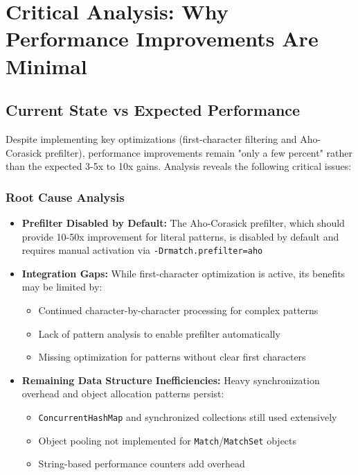 \documentclass[11pt,a4paper]{article}
\begin{document}
\section{Critical Analysis: Why Performance Improvements Are Minimal}

\subsection{Current State vs Expected Performance}

Despite implementing key optimizations (first-character filtering and Aho-Corasick prefilter), performance improvements remain "only a few percent" rather than the expected 3-5x to 10x gains. Analysis reveals the following critical issues:

\subsubsection{Root Cause Analysis}

\begin{itemize}
\item \textbf{Prefilter Disabled by Default:} The Aho-Corasick prefilter, which should provide 10-50x improvement for literal patterns, is disabled by default and requires manual activation via \texttt{-Drmatch.prefilter=aho}

\item \textbf{Integration Gaps:} While first-character optimization is active, its benefits may be limited by:
  \begin{itemize}
  \item Continued character-by-character processing for complex patterns
  \item Lack of pattern analysis to enable prefilter automatically
  \item Missing optimization for patterns without clear first characters
  \end{itemize}

\item \textbf{Remaining Data Structure Inefficiencies:} Heavy synchronization overhead and object allocation patterns persist:
  \begin{itemize}
  \item \texttt{ConcurrentHashMap} and synchronized collections still used extensively
  \item Object pooling not implemented for \texttt{Match}/\texttt{MatchSet} objects
  \item String-based performance counters add overhead
  \end{itemize}
\end{itemize}
\end{document}
